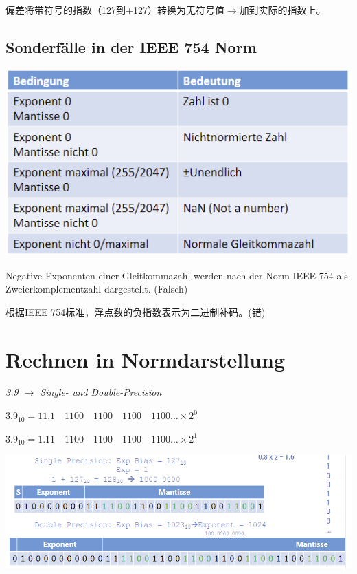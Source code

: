 \documentclass[fleqn]{article}
\begin{document}
偏差将带符号的指数（127到+127）转换为无符号值$\rightarrow$加到实际的指数上。

\subsection{Sonderfälle in der IEEE 754 Norm}

\begin{center}
    \includegraphics[scale=0.6]{19.png}
\end{center}

Negative Exponenten einer Gleitkommazahl werden nach der Norm IEEE 754 als Zweierkomplementzahl dargestellt. (Falsch)

根据IEEE 754标准，浮点数的负指数表示为二进制补码。(错)

\section{Rechnen in Normdarstellung}

\noindent\textit{3.9 $\rightarrow$ Single- und Double-Precision}

$3.9_{10}=11.1\quad 1100\quad 1100\quad 1100\quad 1100 \dots \times 2^0$

$3.9_{10} = 1.11\quad 1100\quad 1100\quad 1100\quad 1100\dots\times 2^1$

\begin{center}
    \includegraphics[scale=0.5]{20.png}
\end{center}
\end{document}
